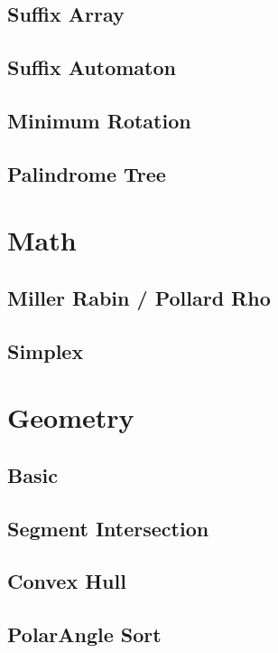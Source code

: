 \subsection{Suffix Array}

\subsection{Suffix Automaton}

\subsection{Minimum Rotation}

\subsection{Palindrome Tree}


\section{Math}
\subsection{Miller Rabin / Pollard Rho}

\subsection{Simplex}


\section{Geometry}
\subsection{Basic}

\subsection{Segment Intersection}

\subsection{Convex Hull}

\subsection{PolarAngle Sort}


